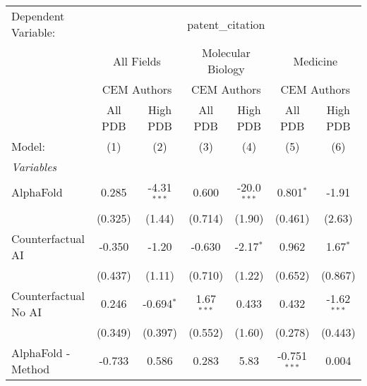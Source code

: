 \begingroup
\centering
\begin{tabular}{lcccccc}
   \tabularnewline \midrule \midrule
   Dependent Variable: & \multicolumn{6}{c}{patent\_citation}\\
 & \multicolumn{2}{c}{All Fields} & \multicolumn{2}{c}{Molecular Biology} & \multicolumn{2}{c}{Medicine} \\
\cmidrule(lr){2-3} \cmidrule(lr){4-5} \cmidrule(lr){6-7}
 & \multicolumn{2}{c}{CEM Authors} & \multicolumn{2}{c}{CEM Authors} & \multicolumn{2}{c}{CEM Authors} \\
\cmidrule(lr){2-3} \cmidrule(lr){4-5} \cmidrule(lr){6-7}
 & \multicolumn{1}{c}{All PDB} & \multicolumn{1}{c}{High PDB} & \multicolumn{1}{c}{All PDB} & \multicolumn{1}{c}{High PDB} & \multicolumn{1}{c}{All PDB} & \multicolumn{1}{c}{High PDB} \\
\cmidrule(lr){2-2} \cmidrule(lr){3-3} \cmidrule(lr){4-4} \cmidrule(lr){5-5} \cmidrule(lr){6-6} \cmidrule(lr){7-7}
   Model:                                                     & (1)           & (2)           & (3)           & (4)           & (5)            & (6)\\  
   \midrule
   \emph{Variables}\\
   AlphaFold                                                  & 0.285         & -4.31$^{***}$ & 0.600         & -20.0$^{***}$ & 0.801$^{*}$    & -1.91\\   
                                                              & (0.325)       & (1.44)        & (0.714)       & (1.90)        & (0.461)        & (2.63)\\   
   Counterfactual AI                                          & -0.350        & -1.20         & -0.630        & -2.17$^{*}$   & 0.962          & 1.67$^{*}$\\   
                                                              & (0.437)       & (1.11)        & (0.710)       & (1.22)        & (0.652)        & (0.867)\\   
   Counterfactual No AI                                       & 0.246         & -0.694$^{*}$  & 1.67$^{***}$  & 0.433         & 0.432          & -1.62$^{***}$\\   
                                                              & (0.349)       & (0.397)       & (0.552)       & (1.60)        & (0.278)        & (0.443)\\   
   AlphaFold - Method                                         & -0.733        & 0.586         & 0.283         & 5.83          & -0.751$^{***}$ & 0.004\\   

\end{tabular}
